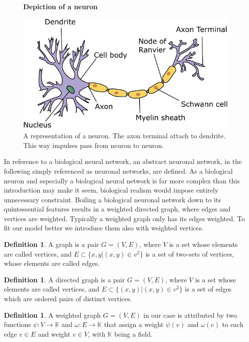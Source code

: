 \documentclass{article}
\theoremstyle{definition}
\newtheorem{definition}[theorem]{Definition}
\newcommand*{\figuretitle}[1]{%
    {\centering%
    \textbf{#1}%
    \par\medskip}%
}
\begin{document}
\begin{figure}[H]
\centering
\figuretitle{Depiction of a neuron}
\includegraphics[scale=0.75]{graphics/neuron.pdf}
\caption{A representation of a neuron. The axon terminal attach to dendrite. This way impulses pass from neuron to neuron.}
\label{fig:neuron}
\end{figure}

In reference to a biological neural network, an abstract neuronal network, in the following simply referenced as neuronal networks, are defined. As a biological neuron and especially a biological neural network is far more complex than this introduction may make it seem, biological realism would impose entirely unnecessary constraint. Boiling a biological neuronal network down to its quintessential features results in a weighted directed graph, where edges and vertices are weighted. Typically a weighted graph only has its edges weighted. To fit our model better we introduce them also with weighted vertices.

\begin{definition}
A graph is a pair $G = (V, E)$, where $V$ is a set whose elements are called vertices, and $E \subset \{ {x, y}|(x,y) \in v^{2} \}$ is a set of two-sets of vertices, whose elements are called edges.
\end{definition}

\begin{definition}
A directed graph is a pair $G = (V, E)$, where $V$ is a set whose elements are called vertices, and $E \subset \{ (x, y)|(x,y) \in v^{2} \}$ is a set of edges which are ordered pairs of distinct vertices.
\end{definition}

\begin{definition}
A weighted graph $G = (V, E)$ in our case is attributed by two functions $\psi : V \to \mathbb{K}$ and $\omega : E \to \mathbb{K}$ that assign a weight $\psi(v)$ and $\omega(e)$ to each edge $e \in E$ and weight $v \in V$, with $\mathbb{K}$ being a field.
\end{definition}
\end{document}
